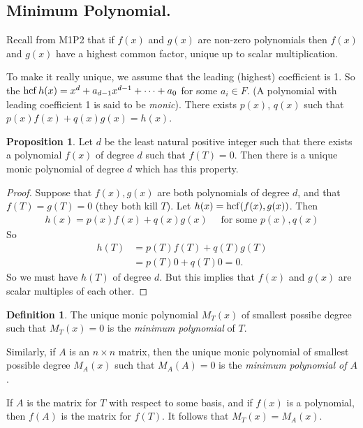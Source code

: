 \documentclass{article}
\theoremstyle{definition} \newtheorem*{definition}{Definition}
\newtheorem{proposition}[theorem]{Proposition}
\begin{document}
\subsection{Minimum Polynomial.}
Recall from M1P2 that if $f(x)$ and $g(x)$ are non-zero polynomials then
$f(x)$ and $g(x)$ have a highest common factor, unique up to scalar
multiplication.

To make it really unique, we assume that the leading (highest) coefficient
is 1. So the $\operatorname{hcf} h(x) = x^d + a_{d-1}x^{d-1} + \dots + a_0$ for some
$a_i \in F$. (A polynomial with leading coefficient 1 is said to be 
\emph{monic}).
There exists $p(x)$, $q(x)$ such that $p(x)f(x)+q(x)g(x)=h(x)$.\\

\begin{proposition}
  Let $d$ be the least natural positive integer such that there exists a
  polynomial $f(x)$ of degree $d$ such that $f(T)=0$. Then there is  a
  unique monic polynomial of degree $d$ which has this property.
\end{proposition}

\begin{proof}
  Suppose that $f(x),g(x)$ are both polynomials of degree $d$, and that
  $f(T)=g(T)=0$ (they both kill $T$). Let $h(x) = \operatorname{hcf} (f(x),g(x))$. Then
  \begin{align*}
    h(x) = p(x)f(x) + q(x)g(x) \quad \text{ for some } p(x),q(x)
  \end{align*}
  So 
  \begin{align*}
    h(T) &= p(T)f(T) + q(T)g(T) \\
    &= p(T)0 + q(T)0 = 0.
  \end{align*}
  So we must have $h(T)$ of degree $d$. But this implies that $f(x)$ and
  $g(x)$ are scalar multiples of each other.
\end{proof}

\begin{definition}
  The unique monic polynomial $M_T(x)$ of smallest possibe degree such
  that $M_T(x)=0$ is the \emph{minimum polynomial} of $T$.

  Similarly, if $A$ is an $n \times n$ matrix, then the unique 
  monic  polynomial of smallest possible degree $M_A(x)$ such that
  $M_A(A) = 0$ is the \emph{minimum polynomial of $A$}.\\
\end{definition}

\begin{remark}
  If $A$ is the matrix for $T$ with respect to some basis, and if $f(x)$ is
  a polynomial, then $f(A)$ is the matrix for $f(T)$. It follows that 
  $M_T(x)=M_A(x)$.
\end{remark}
\end{document}
